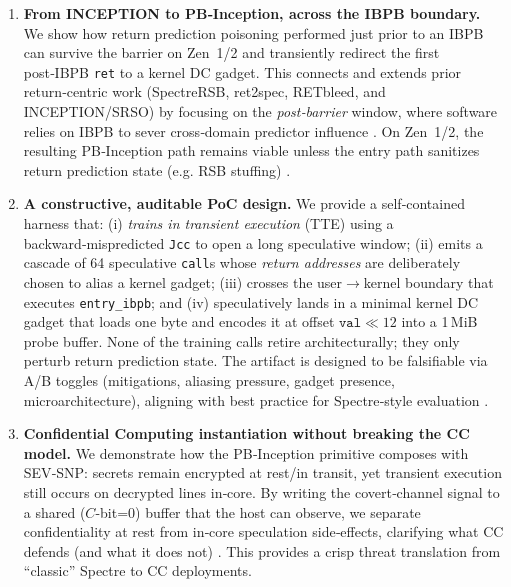 \documentclass[11pt,a4paper]{article}
\begin{document}
\begin{enumerate}
  \item \textbf{From INCEPTION to PB‑Inception, across the IBPB boundary.}
  We show how return prediction poisoning performed just prior to an IBPB can survive the barrier on Zen~1/2 and transiently redirect the first post‑IBPB \texttt{ret} to a kernel DC gadget. This connects and extends prior return‑centric work (SpectreRSB, ret2spec, RETbleed, and INCEPTION/SRSO) by focusing on the \emph{post‑barrier} window, where software relies on IBPB to sever cross‑domain predictor influence \cite{koruyeh2018spectrersb,maisuradze2018ret2spec,wikner2022retbleed,trujillo2023inception,linux_srso_doc,wikner2025breaking}. On Zen~1/2, the resulting PB‑Inception path remains viable unless the entry path sanitizes return prediction state (e.g. RSB stuffing) \cite{linux_rsb_doc,wikner2025breaking}.

  \item \textbf{A constructive, auditable PoC design.}
  We provide a self‑contained harness that: (i) \emph{trains in transient execution} (TTE) using a backward‑mispredicted \texttt{Jcc} to open a long speculative window; (ii) emits a cascade of 64 speculative \texttt{call}s whose \emph{return addresses} are deliberately chosen to alias a kernel gadget; (iii) crosses the user\(\rightarrow\)kernel boundary that executes \texttt{entry\_ibpb}; and (iv) speculatively lands in a minimal kernel DC gadget that loads one byte and encodes it at offset \(\texttt{val} \ll 12\) into a 1\,MiB probe buffer. None of the training calls retire architecturally; they only perturb return prediction state. The artifact is designed to be falsifiable via A/B toggles (mitigations, aliasing pressure, gadget presence, microarchitecture), aligning with best practice for Spectre‑style evaluation \cite{kocher2018spectre,trujillo2023inception,wikner2025breaking,linux_srso_doc,linux_rsb_doc}.

  \item \textbf{Confidential Computing instantiation without breaking the CC model.}
  We demonstrate how the PB‑Inception primitive composes with SEV‑SNP: secrets remain encrypted at rest/in transit, yet transient execution still occurs on decrypted lines in‑core. By writing the covert‑channel signal to a shared (\(C\)-bit=0) buffer that the host can observe, we separate confidentiality at rest from in‑core speculation side‑effects, clarifying what CC defends (and what it does not) \cite{linux_srso_doc}. This provides a crisp threat translation from “classic” Spectre to CC deployments.


\end{enumerate}
\end{document}
